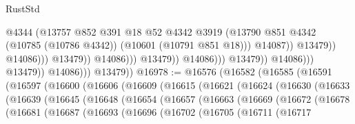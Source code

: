\begin{lexlean}{RustStd}
\begin{coremodule}
                                                            @4344
                                                            (@13757
                                                              @852
                                                              @391
                                                              @18
                                                              @52
                                                              @4342
                                                              @3919
                                                              (@13790
                                                                @851
                                                                @4342
                                                                (@10785 (@10786 @4342))
                                                                (@10601 (@10791 @851 @18)))
                                                              @14087))
                                                          @13479))
                                                      @14086)))
                                                @13479))
                                            @14086)))
                                      @13479))
                                  @14086)))
                            @13479))
                        @14086)))
                  @13479))
              @14086)))
        @13479))
@16978 := @16576
    (@16582
      (@16585
        (@16591
          (@16597
            (@16600
              (@16606
                (@16609
                  (@16615
                    (@16621
                      (@16624
                        (@16630
                          (@16633
                            (@16639
                              (@16645
                                (@16648
                                  (@16654
                                    (@16657
                                      (@16663
                                        (@16669
                                          (@16672
                                            (@16678
                                              (@16681
                                                (@16687
                                                  (@16693
                                                    (@16696
                                                      (@16702
                                                        (@16705
                                                          (@16711
                                                            (@16717

\end{coremodule}
\end{lexlean}
